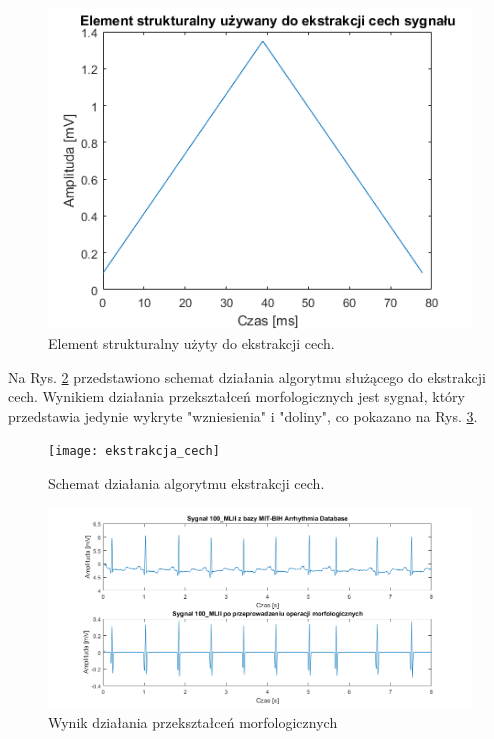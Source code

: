 \documentclass[10pt,a4paper]{article}
\begin{document}
\begin{figure}[h]
	\centerline{\includegraphics[scale=0.6]{element_strukturalny}}
	\caption{ Element strukturalny użyty do ekstrakcji cech.}
	\label{elementstrukturalny}
\end{figure}
\FloatBarrier

Na Rys. \ref{ekstrakcja_cech} przedstawiono schemat działania algorytmu służącego do ekstrakcji cech. Wynikiem działania przekształceń morfologicznych jest sygnał, który przedstawia jedynie wykryte "wzniesienia" i "doliny", co pokazano na Rys. \ref{e_op_morf}.

\begin{figure}[h]
	\centerline{\texttt{[image: ekstrakcja\_cech]}}
	\caption{ Schemat działania algorytmu ekstrakcji cech.}
	\label{ekstrakcja_cech}
\end{figure}


\begin{figure}[h]
	\centerline{\includegraphics[scale=0.6]{efekt_operacji_morfologicznych}}
	\caption{Wynik działania przekształceń morfologicznych}
	\label{e_op_morf}
\end{figure}
\FloatBarrier
\end{document}
